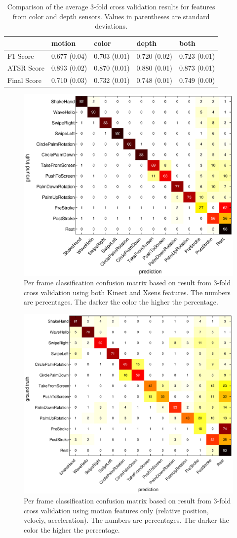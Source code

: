 \begin{table}[h]
\begin{center}
\begin{tabular}{|l|p{2cm}|p{2cm}|p{1.7cm}|p{1.7cm}|}
\hline
          & motion & color & depth & both \\
\hline
F1 Score & 0.677 (0.04) & 0.703 (0.01) & 0.720 (0.02) & 0.723 (0.01) \\
\hline
ATSR Score & 0.893 (0.02) & 0.870 (0.01) & 0.880 (0.01) & 0.873 (0.01) \\
\hline
Final Score & 0.710 (0.03) & 0.732 (0.01) & 0.748 (0.01) & 0.749 (0.00) \\
\hline
\end{tabular}
\caption{Comparison of the average 3-fold cross validation results for
features from color and depth sensors. Values in parentheses are standard
deviations.}
\label{tab:comp-feature}
\end{center}
\end{table}

\begin{figure}[h]
\centering
\includegraphics[trim={6cm 3.5cm 10cm 1.5cm}, clip,
width=0.5\columnwidth]{figures/confusion-matrix.eps} \caption{Per frame
classification confusion matrix based on result from 3-fold cross validation using both Kinect and Xsens features. The numbers are percentages. The darker the color the higher the percentage.}
\label{fig:confusion}
\end{figure}

\begin{figure}[h]
\centering
\includegraphics[trim={6cm 3.5cm 10cm 1.5cm}, clip,
width=0.6\columnwidth]{figures/confusion_motion.eps} \caption{Per frame
classification confusion matrix based on result from 3-fold cross validation
using motion features only (relative position, velociy, acceleration). The
numbers are percentages.
The darker the color the higher the percentage.}
\label{fig:confusion}
\end{figure}

